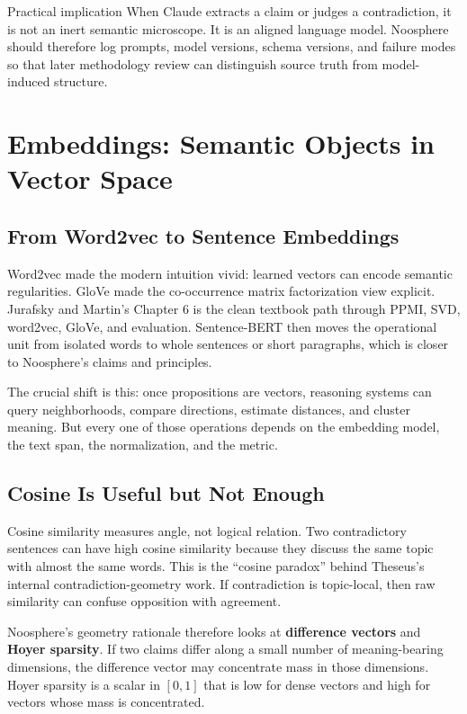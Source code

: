 \documentclass[11pt]{article}
\begin{document}
\begin{readerbox}{Practical implication}
When Claude extracts a claim or judges a contradiction, it is not an inert
semantic microscope. It is an aligned language model. Noosphere should therefore
log prompts, model versions, schema versions, and failure modes so that later
methodology review can distinguish source truth from model-induced structure.
\end{readerbox}

\section{Embeddings: Semantic Objects in Vector Space}

\subsection{From Word2vec to Sentence Embeddings}

Word2vec made the modern intuition vivid: learned vectors can encode semantic
regularities. GloVe made the co-occurrence matrix factorization view explicit.
Jurafsky and Martin's Chapter 6 is the clean textbook path through PPMI, SVD,
word2vec, GloVe, and evaluation. Sentence-BERT then moves the operational unit
from isolated words to whole sentences or short paragraphs, which is closer to
Noosphere's claims and principles.

The crucial shift is this: once propositions are vectors, reasoning systems can
query neighborhoods, compare directions, estimate distances, and cluster
meaning. But every one of those operations depends on the embedding model, the
text span, the normalization, and the metric.

\subsection{Cosine Is Useful but Not Enough}

Cosine similarity measures angle, not logical relation. Two contradictory
sentences can have high cosine similarity because they discuss the same topic
with almost the same words. This is the ``cosine paradox'' behind Theseus's
internal contradiction-geometry work. If contradiction is topic-local, then raw
similarity can confuse opposition with agreement.

Noosphere's geometry rationale therefore looks at \textbf{difference vectors}
and \textbf{Hoyer sparsity}. If two claims differ along a small number of
meaning-bearing dimensions, the difference vector may concentrate mass in those
dimensions. Hoyer sparsity is a scalar in $[0,1]$ that is low for dense vectors
and high for vectors whose mass is concentrated.
\end{document}
